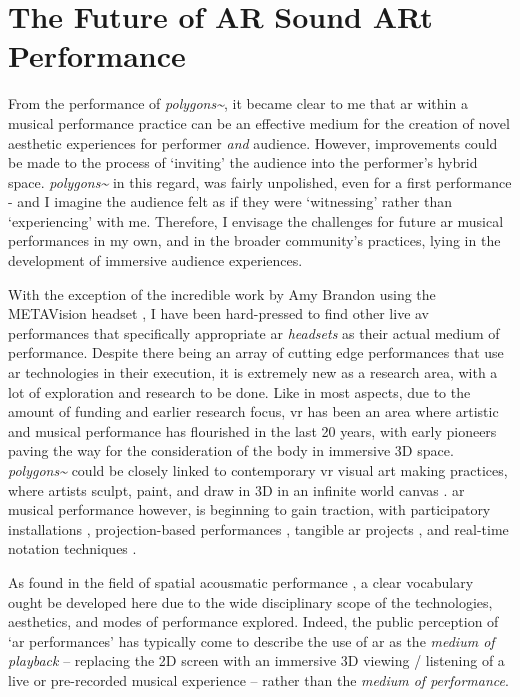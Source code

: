 \section{The Future of AR Sound ARt Performance}
From the performance of \textit{polygons\textasciitilde{}}, it became clear to me that \gls{ar} within a musical performance practice can be an effective medium for the creation of novel aesthetic experiences for performer \textit{and} audience. However, improvements could be made to the process of `inviting' the audience into the performer's hybrid space. \textit{polygons\textasciitilde{}} in this regard, was fairly unpolished, even for a first performance - and I imagine the audience felt as if they were `witnessing' rather than `experiencing' with me. Therefore, I envisage the challenges for future \gls{ar} musical performances in my own, and in the broader community's practices, lying in the development of immersive audience experiences.

 With the exception of the incredible work by Amy Brandon using the METAVision headset \citeyearpar{brandon2018}, I have been hard-pressed to find other live \gls{av} performances that specifically appropriate \gls{ar} \textit{headsets} as their actual medium of performance. Despite there being an array of cutting edge performances that use \gls{ar} technologies in their execution, it is extremely new as a research area, with a lot of exploration and research to be done. Like in most aspects, due to the amount of funding and earlier research focus, \gls{vr} has been an area where artistic and musical performance has flourished in the last 20 years, with early pioneers \citep{davies2004} paving the way for the consideration of the body in immersive 3D space. \textit{polygons\textasciitilde{}} could be closely linked to contemporary \gls{vr} visual art making practices, where artists sculpt, paint, and draw in 3D in an infinite world canvas \citep{summers2019}. \gls{ar} musical performance however, is beginning to gain traction, with participatory installations \citep{chevalier2018},  projection-based performances \citep{quay2016,berthaut2016,robinson2020}, tangible \gls{ar} projects \citep{zamborlin2018}, and real-time notation techniques \citep{santini2020,santini2022}. 

As found in the field of spatial acousmatic performance \citep{sharma2015}, a clear vocabulary ought be developed here due to the wide disciplinary scope of the technologies, aesthetics, and modes of performance explored. Indeed, the public perception of `\gls{ar} performances' has typically come to describe the use of \gls{ar} as the \textit{medium of playback} -- replacing the 2D screen with an immersive 3D viewing / listening of a live or pre-recorded musical experience -- rather than the \textit{medium of performance}.

